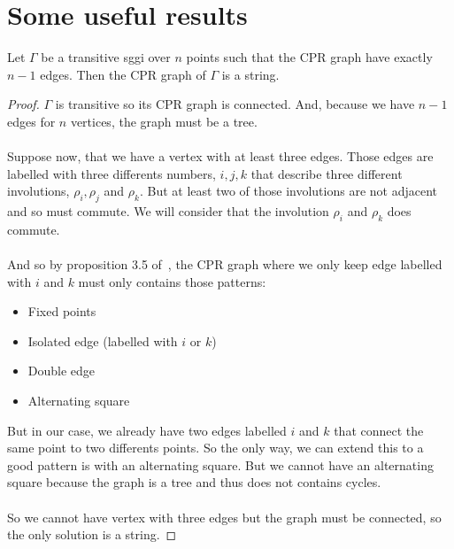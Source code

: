 \section{Some useful results}

\begin{lemma}
  Let $\Gamma$ be a transitive sggi over $n$ points such that the CPR graph have exactly $n-1$ edges. Then the CPR graph of $\Gamma$ is a string.
\end{lemma}

\begin{proof}\label{graphIsString}
  $\Gamma$ is transitive so its CPR graph is connected. And, because we have $n-1$ edges for $n$ vertices, the graph must be a tree.

  \paragraph{}
  Suppose now, that we have a vertex with at least three edges. Those edges are labelled with three differents numbers, $i, j, k$ that describe three different involutions, $\rho_i, \rho_j$ and $\rho_k$. But at least two of those involutions are not adjacent and so must commute. We will consider that the involution $\rho_i$ and $\rho_k$ does commute.

  \paragraph{}
  And so by proposition 3.5 of~\cite{cprGraph}, the CPR graph where we only keep edge labelled with $i$ and $k$ must only contains those patterns:
  \begin{itemize}
    \item Fixed points
    \item Isolated edge (labelled with $i$ or $k$)
    \item Double edge
    \item Alternating square
  \end{itemize}
  But in our case, we already have two edges labelled $i$ and $k$ that connect the same point to two differents points. So the only way, we can extend this to a good pattern is with an alternating square. But we cannot have an alternating square because the graph is a tree and thus does not contains cycles.

  \paragraph{}
  So we cannot have vertex with three edges but the graph must be connected, so the only solution is a string.
\end{proof}

